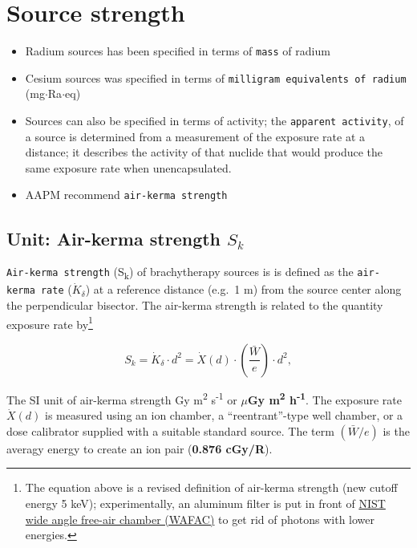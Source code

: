 \documentclass[]{book}
\providecommand{\tightlist}{%
  \setlength{\itemsep}{0pt}\setlength{\parskip}{0pt}}
\let\rmarkdownfootnote\footnote%
\def\footnote{\protect\rmarkdownfootnote}
\theoremstyle{definition}
\theoremstyle{definition}
\theoremstyle{definition}
\theoremstyle{remark}
\begin{document}
\section{Source strength}\label{source-strength}

\begin{itemize}
\tightlist
\item
  Radium sources has been specified in terms of \texttt{mass} of radium
\item
  Cesium sources was specified in terms of
  \texttt{milligram\ equivalents\ of\ radium} (mg\(\cdot\)Ra\(\cdot\)eq)
\item
  Sources can also be specified in terms of activity; the
  \texttt{apparent\ activity}, of a source is determined from a
  measurement of the exposure rate at a distance; it describes the
  activity of that nuclide that would produce the same exposure rate
  when unencapsulated.
\item
  AAPM recommend \texttt{air-kerma\ strength}
\end{itemize}

\subsection{\texorpdfstring{Unit: Air-kerma strength
\(S_k\)}{Unit: Air-kerma strength S\_k}}\label{sk}

\texttt{Air-kerma\ strength} (S\textsubscript{k}) of brachytherapy
sources is is defined as the \texttt{air-kerma\ rate}
(\(\dot{K}_{\delta}\)) at a reference distance (e.g.~1 m) from the
source center along the perpendicular bisector. The air-kerma strength
is related to the quantity exposure rate by\footnote{The equation above
  is a revised definition of air-kerma strength (new cutoff energy 5
  keV); experimentally, an aluminum filter is put in front of
  \href{https://www.nist.gov/programs-projects/calibration-low-energy-photon-brachytherapy-sources}{NIST
  wide angle free-air chamber (WAFAC)} to get rid of photons with lower
  energies.}

\begin{equation}
  S_k =\dot K_\delta \cdot d^2 = \dot X(d) \cdot  \left( \frac{\bar W}{e}\right) \cdot d^2,
  \label{eq:sk}
\end{equation}

The SI unit of air-kerma strength Gy m\textsuperscript{2}
s\textsuperscript{-1} or \textbf{\(\mu\)Gy m\textsuperscript{2}
h\textsuperscript{-1}}. The exposure rate \(\dot X(d)\) is measured
using an ion chamber, a ``reentrant''-type well chamber, or a dose
calibrator supplied with a suitable standard source. The term
\(({\bar W}/e )\) is the averagy energy to create an ion pair
(\textbf{0.876 cGy/R}).
\end{document}
